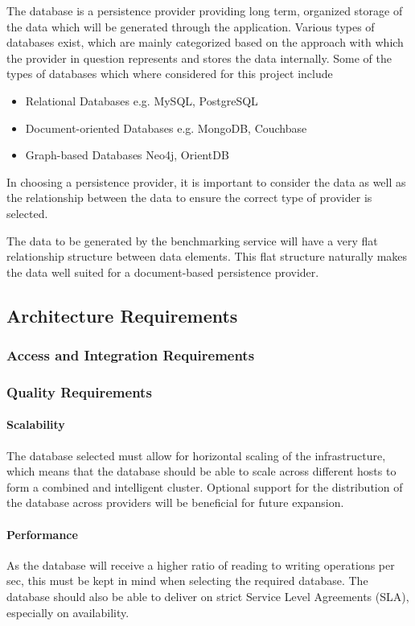 The database is a persistence provider providing long term, organized storage
of the data which will be generated through the application. Various types of
databases exist, which are mainly categorized based on the approach with which
the provider in question represents and stores the data internally. Some of 
the types of databases which where considered for this project include
\begin{itemize}
	\item Relational Databases e.g. MySQL, PostgreSQL
	\item Document-oriented Databases e.g. MongoDB, Couchbase
	\item Graph-based Databases Neo4j, OrientDB
\end{itemize}

In choosing a persistence provider, it is important to consider the data as
well as the relationship between the data to ensure the correct type of 
provider is selected.

The data to be generated by the benchmarking service will have a very flat
relationship structure between data elements. This flat structure naturally
makes the data well suited for a document-based persistence provider.

\subsection{Architecture Requirements}
\subsubsection{Access and Integration Requirements}
\subsubsection{Quality Requirements}
\paragraph{Scalability}
The database selected must allow for horizontal scaling of the infrastructure,
which means that the database should be able to scale across different hosts to
form a combined and intelligent cluster. Optional support for the distribution of the
database across providers will be beneficial for future expansion.

\paragraph{Performance}
As the database will receive a higher ratio of reading to writing operations
per sec, this must be kept in mind when selecting the required database. The
database should also be able to deliver on strict Service Level Agreements
(SLA), especially on availability.

